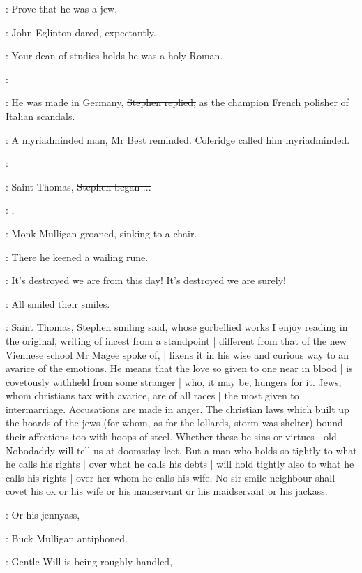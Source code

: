 \eglinton:
Prove that he was a jew,

:
John Eglinton dared, expectantly.

\eglinton:
Your dean of studies holds he was a holy Roman.

\StephenInt:

\Stephen:
He was made in Germany,
\sout{Stephen replied,}
as the champion French polisher of Italian scandals.

\best:
A myriadminded man,
\sout{Mr Best reminded.}
Coleridge called him myriadminded.

\StephenInt:

\Stephen:
Saint Thomas,
\sout{Stephen began ...}

\mulligan:
,

:
Monk Mulligan groaned,
sinking to a chair.

:
There he keened a wailing rune.

\mulligan:
It's destroyed we are from this day!
It's destroyed we are surely!

:
All smiled their smiles.

\Stephen:
Saint Thomas,
\sout{Stephen smiling said,}
whose gorbellied works I enjoy reading in the original,
writing of incest from a standpoint |
different from that of the new Viennese school Mr Magee spoke of, |
likens it in his wise and curious way to an avarice of the emotions.
He means that the love so given to one near in blood |
is covetously withheld from some stranger |
who, it may be,
hungers for it.
Jews, whom christians tax with avarice,
are of all races |
the most given to intermarriage.
Accusations are made in anger.
The christian laws which built up the hoards of the jews
(for whom,
as for the lollards,
storm was shelter)
bound their affections too with hoops of steel.
Whether these be sins or virtues |
old Nobodaddy will tell us at doomsday leet.
But a man who holds so tightly to what he calls his rights |
over what he calls his debts |
will hold tightly also to what he calls his rights |
over her whom he calls his wife.
No sir smile neighbour shall covet his ox
or his wife
or his manservant
or his maidservant
or his jackass.

\mulligan:
Or his jennyass,

:
Buck Mulligan antiphoned.

\best:
Gentle Will is being roughly handled,

